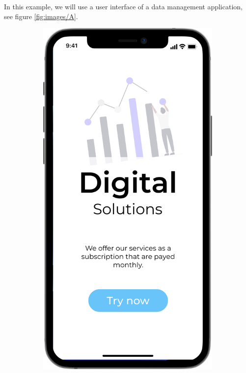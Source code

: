 In this example, we will use a user interface of a data management application, see figure \ref{fig:images/A}. 

\begin{figure}[H]
  \centering
  \begin{subfigure}[b]{0.45\textwidth}
    \includegraphics[width=\linewidth]{images/A.png}

\end{subfigure}
\end{figure}
